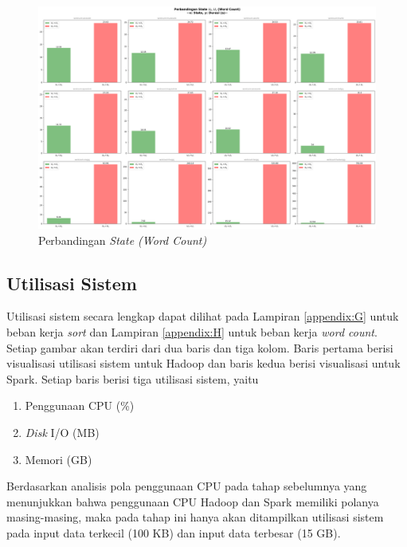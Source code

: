 \begin{landscape}
\begin{figure}[h]
    \centering
    \includegraphics[height=0.6\linewidth]{figures/ch04/4-state-wordcount.png}
    \caption{Perbandingan \textit{State  (Word Count)}}
    \label{fig:4-state-wordcount}
\end{figure}
\end{landscape}

\newpage
\subsection{Utilisasi Sistem}
Utilisasi sistem secara lengkap dapat dilihat pada Lampiran \ref{appendix:G} untuk beban kerja \textit{sort} dan Lampiran \ref{appendix:H} untuk beban kerja \textit{word count}. Setiap gambar akan terdiri dari dua baris dan tiga kolom. Baris pertama berisi visualisasi utilisasi sistem untuk Hadoop dan baris kedua berisi visualisasi untuk Spark. Setiap baris berisi tiga utilisasi sistem, yaitu
\begin{enumerate}
\item Penggunaan CPU (\%)
\item \textit{Disk} I/O (MB)
\item Memori (GB)
\end{enumerate}

Berdasarkan analisis pola penggunaan CPU pada tahap sebelumnya yang menunjukkan bahwa penggunaan CPU Hadoop dan Spark memiliki polanya masing-masing, maka pada tahap ini hanya akan ditampilkan utilisasi sistem pada input data terkecil (100 KB) dan input data terbesar (15 GB).

